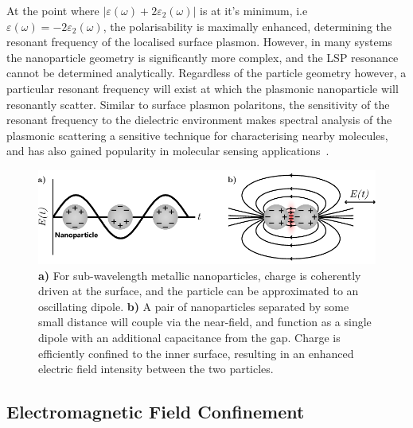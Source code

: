 At the point where $\lvert \varepsilon (\omega) + 2\varepsilon_2 (\omega) \rvert$ is at it's minimum, i.e $\varepsilon (\omega) = -2\varepsilon_2 (\omega)$, the polarisability is maximally enhanced, determining the resonant frequency of the localised surface plasmon. However, in many systems the nanoparticle geometry is significantly more complex, and the LSP resonance cannot be determined analytically. Regardless of the particle geometry however, a particular resonant frequency will exist at which the plasmonic nanoparticle will resonantly scatter. Similar to surface plasmon polaritons, the sensitivity of the resonant frequency to the dielectric environment makes spectral analysis of the plasmonic scattering a sensitive technique for characterising nearby molecules, and has also gained popularity in molecular sensing applications~\cite{Petryayeva2011a, Polavarapu2014, Cheng2015}.


\begin{figure}[htb!]
    \centering
    \includegraphics[scale=1.0]{./figures/background/plasmonics/lsp.pdf}
    \caption{\label{fig:background:Plasmonics:LSP} \textbf{a)} For sub-wavelength metallic nanoparticles, charge is coherently driven at the surface, and the particle can be approximated to an oscillating dipole. \textbf{b)} A pair of nanoparticles separated by some small distance will couple via the near-field, and function as a single dipole with an additional capacitance from the gap. Charge is efficiently confined to the inner surface, resulting in an enhanced electric field intensity between the two particles.}
\end{figure}


\subsection{Electromagnetic Field Confinement}\label{sec:Plasmonics:confinement}

